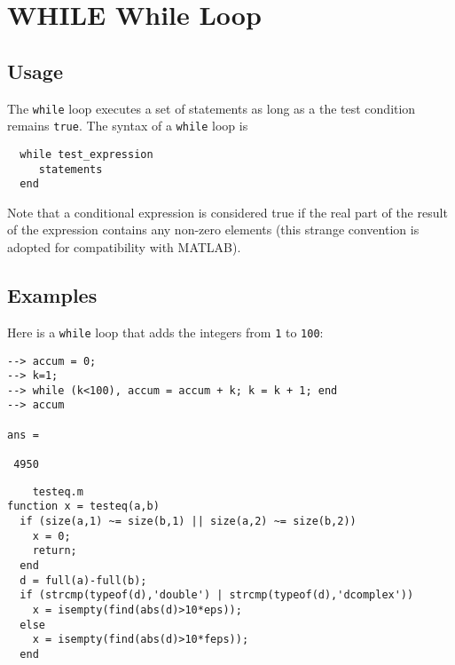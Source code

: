 \section{WHILE While Loop}

\subsection{Usage}

The \verb|while| loop executes a set of statements as long as
a the test condition remains \verb|true|.  The syntax of a 
\verb|while| loop is
\begin{verbatim}
  while test_expression
     statements
  end
\end{verbatim}
Note that a conditional expression is considered true if 
the real part of the result of the expression contains
any non-zero elements (this strange convention is adopted
for compatibility with MATLAB).
\subsection{Examples}

Here is a \verb|while| loop that adds the integers from \verb|1|
to \verb|100|:
\begin{verbatim}
--> accum = 0;
--> k=1;
--> while (k<100), accum = accum + k; k = k + 1; end
--> accum

ans = 

 4950 
\end{verbatim}
\begin{verbatim}
    testeq.m
function x = testeq(a,b)
  if (size(a,1) ~= size(b,1) || size(a,2) ~= size(b,2))
    x = 0;
    return;
  end
  d = full(a)-full(b);
  if (strcmp(typeof(d),'double') | strcmp(typeof(d),'dcomplex'))
    x = isempty(find(abs(d)>10*eps));
  else
    x = isempty(find(abs(d)>10*feps));
  end
\end{verbatim}
